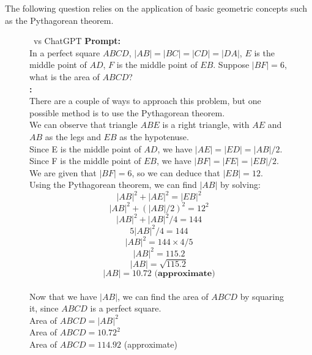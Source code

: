 The following question relies on the application of basic geometric concepts such as the Pythagorean theorem.
\begin{figure}[H]
\begin{AIbox}{\DV \ vs ChatGPT}
{\bf Prompt:} \\
{\scriptsize
In a perfect square $ABCD$, $|AB| = |BC| = |CD| = |DA|$, $E$ is the middle point of $AD$,  $F$ is the middle point of $EB$. Suppose $|BF| = 6$, what is the area of $ABCD$?
}\\

{\bf \DV:} \\
{\scriptsize
There are a couple of ways to approach this problem, but one possible method is to use the Pythagorean theorem. \\

We can observe that triangle $ABE$ is a right triangle,  with $AE$ and $AB$  as the legs and $EB$ as the hypotenuse. \\

Since E is the middle point of $AD$, we have $|AE| = |ED| = |AB| / 2$. \\

Since F is the middle point of $EB$, we have $|BF| = |FE| = |EB| / 2$. \\

We are given that $|BF| = 6$, so we can deduce that $|EB| = 12$. \\

Using the Pythagorean theorem, we can find $|AB|$ by solving:
$$|AB|^2 + |AE|^2 = |EB|^2$$
$$|AB|^2 + (|AB| / 2)^2 = 12^2$$
$$|AB|^2 + |AB|^2 / 4 = 144$$
$$5|AB|^2 / 4 = 144$$
$$|AB|^2 = 144 \times 4 / 5$$
$$|AB|^2 = 115.2$$
$$|AB| = \sqrt{115.2}$$
$$|AB| = 10.72 \textbf{ (approximate)}$$\\

Now that we have $|AB|$, we can find the area of $ABCD$ by squaring it, since $ABCD$ is a perfect square.\\
Area of $ABCD = |AB|^2$\\
Area of $ABCD = 10.72^2$\\
Area of $ABCD = 114.92$ (approximate)\\

}
\end{AIbox}
\end{figure}
